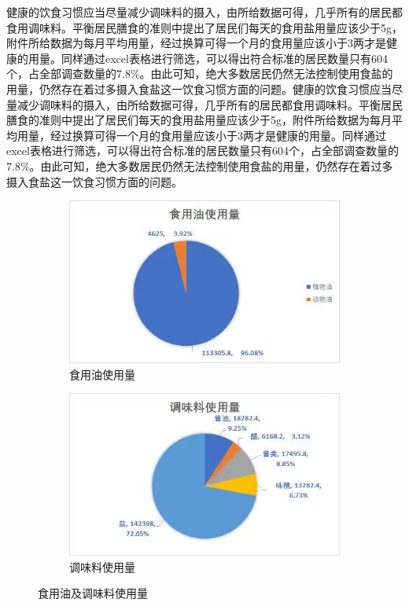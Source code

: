 \documentclass[withoutpreface,bwprint]{cumcmthesis} %
\begin{document}
 健康的饮食习惯应当尽量减少调味料的摄入，由所给数据可得，几乎所有的居民都食用调味料。平衡居民膳食的准则中提出了居民们每天的食用盐用量应该少于5g，附件所给数据为每月平均用量，经过换算可得一个月的食用量应该小于3两才是健康的用量。同样通过excel表格进行筛选，可以得出符合标准的居民数量只有604个，占全部调查数量的7.8\%。由此可知，绝大多数居民仍然无法控制使用食盐的用量，仍然存在着过多摄入食盐这一饮食习惯方面的问题。健康的饮食习惯应当尽量减少调味料的摄入，由所给数据可得，几乎所有的居民都食用调味料。平衡居民膳食的准则中提出了居民们每天的食用盐用量应该少于5g，附件所给数据为每月平均用量，经过换算可得一个月的食用量应该小于3两才是健康的用量。同样通过excel表格进行筛选，可以得出符合标准的居民数量只有604个，占全部调查数量的7.8\%。由此可知，绝大多数居民仍然无法控制使用食盐的用量，仍然存在着过多摄入食盐这一饮食习惯方面的问题。
\begin{figure}[H]
  \centering

  \begin{subfigure}[b]{0.45\textwidth}
    \includegraphics[width=\textwidth]{figures/QQ图片20230813183040.jpg}
    \caption{食用油使用量}
    \label{t11}
  \end{subfigure}
  \hfill
  \begin{subfigure}[b]{0.45\textwidth}
    \includegraphics[width=\textwidth]{figures/QQ图片20230813170545.jpg}
    \caption{调味料使用量}
    \label{t12}
  \end{subfigure}
  \caption{食用油及调味料使用量}
\end{figure}
\end{document}
